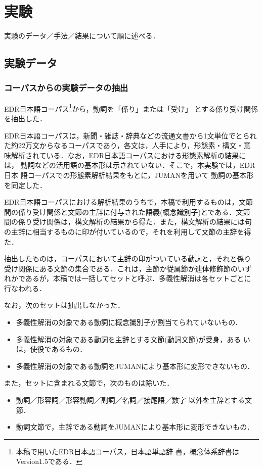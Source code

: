 \section{実験}
\label{sec:experiment}

実験のデータ／手法／結果について順に述べる．

\subsection{実験データ}
\label{sec:data}

\subsubsection{コーパスからの実験データの抽出}

EDR日本語コーパス\footnote{本稿で用いたEDR日本語コーパス，日本語単語辞
書，概念体系辞書はVersion1.5である．}から，動詞を「係り」または「受け」
とする係り受け関係を抽出した．

EDR日本語コーパスは，新聞・雑誌・辞典などの流通文書から1文単位でとられ
た約22万文からなるコーパスであり，各文は，人手により，形態素・構文・意
味解析されている．なお，EDR日本語コーパスにおける形態素解析の結果には，
動詞などの活用語の基本形は示されていない．そこで，本実験では，EDR日本
語コーパスでの形態素解析結果をもとに，JUMAN\cite{Matsumoto94}を用いて
動詞の基本形を同定した．

EDR日本語コーパスにおける解析結果のうちで，本稿で利用するものは，文節
間の係り受け関係と文節の主辞に付与された語義(概念識別子)とである．文節
間の係り受け関係は，構文解析の結果から得た．また，構文解析の結果には句
の主辞に相当するものに印が付いているので，それを利用して文節の主辞を得
た．

抽出したものは，コーパスにおいて主辞の印がついている動詞と，それと係り
受け関係にある文節の集合である．これは，主節か従属節か連体修飾節のいず
れかであるが，本稿では一括してセットと呼ぶ．多義性解消は各セットごとに
行なわれる．

なお，次のセットは抽出しなかった．
\begin{itemize}
\item 多義性解消の対象である動詞に概念識別子が割当てられていないもの．
\item 多義性解消の対象である動詞を主辞とする文節(動詞文節)が受身，ある
いは，使役であるもの．
\item 多義性解消の対象である動詞をJUMANにより基本形に変形できないもの．
\end{itemize}
また，セットに含まれる文節で，次のものは除いた．
\begin{itemize}
\item 動詞／形容詞／形容動詞／副詞／名詞／接尾語／数字 以外を主辞とする文節．
\item 動詞文節で，主辞である動詞をJUMANにより基本形に変形できないもの．
\end{itemize}

